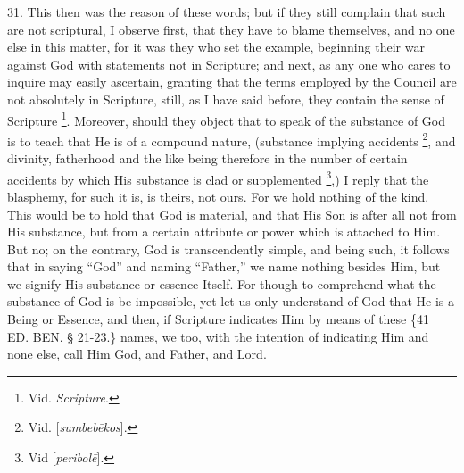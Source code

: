 31. This then was the reason
of these words; but if they still complain that such are not
scriptural, I observe first, that they have to blame themselves, and
no one else in this matter, for it was they who set the example,
beginning their war against God with statements not in Scripture; and
next, as any one who cares to inquire may easily ascertain, granting
that the terms employed by the Council are not absolutely in
Scripture, still, as I have said before, they contain the sense of
Scripture \footnote{Vid. \emph{Scripture}.}. Moreover,
should they object that to speak of the substance of God is to teach
that He is of a compound nature, (substance implying accidents \footnote{Vid. [\emph{sumbeb\={e}kos}].}, and divinity, fatherhood and the like being therefore in the
number of certain accidents by which His substance is clad or
supplemented \footnote{Vid [\emph{peribol\={e}}].},) I reply
that the blasphemy, for such it is, is theirs, not ours. For we hold
nothing of the kind. This would be to hold that God is material, and
that His Son is after all not from His substance, but from a certain
attribute or power which is attached to Him. But no; on the contrary,
God is transcendently simple, and being such, it follows that in
saying ``God'' and naming ``Father,'' we name nothing besides Him, but we
signify His substance or essence Itself. For though to comprehend what
the substance of God is be impossible, yet let us only understand of
God that He is a Being or Essence, and then, if Scripture indicates
Him by means of these \{41 | ED.
BEN.
§ 21-23.\} names, we too, with the intention of indicating Him and
none else, call Him God, and Father, and Lord.

